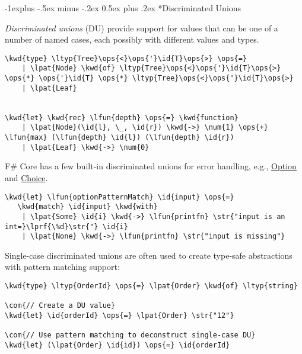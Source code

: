 \documentclass[10pt,landscape]{article}
\makeatletter
\renewcommand{\subsection}{\@startsection{subsection}{2}{0mm}%
                                {-1explus -.5ex minus -.2ex}%
                                {0.5ex plus .2ex}%
                                {\normalfont\normalsize\bfseries}}
\newcommand{\id}[1]{\textcolor[HTML]{000000}{#1}}
\newcommand{\str}[1]{\textcolor[HTML]{A31515}{#1}}
\newcommand{\kwd}[1]{\textcolor[HTML]{0000FF}{#1}}
\newcommand{\com}[1]{\textcolor[HTML]{008000}{#1}}
\newcommand{\ops}[1]{\textcolor[HTML]{000000}{#1}}
\newcommand{\num}[1]{\textcolor[HTML]{000000}{#1}}
\newcommand{\ltyp}[1]{\textcolor[HTML]{2B91AF}{#1}}
\newcommand{\lfun}[1]{\textcolor[HTML]{AA5500}{#1}}
\newcommand{\lpat}[1]{\textcolor[HTML]{800080}{#1}}
\newcommand{\lprf}[1]{\textcolor[HTML]{2B91AF}{#1}}
\makeatother
\begin{document}
\begin{multicols}{3}
\begin{Verbatim}[commandchars=\\\{\}]
\end{Verbatim}

\subsection*{Discriminated Unions}



\emph{Discriminated unions} (DU) provide support for values that can be one of a number of named cases, each possibly with different values and types.
\begin{Verbatim}[commandchars=\\\{\}]
\kwd{type} \ltyp{Tree}\ops{<}\ops{'}\id{T}\ops{>} \ops{=}
    | \lpat{Node} \kwd{of} \ltyp{Tree}\ops{<}\ops{'}\id{T}\ops{>} \ops{*} \ops{'}\id{T} \ops{*} \ltyp{Tree}\ops{<}\ops{'}\id{T}\ops{>}
    | \lpat{Leaf}


\kwd{let} \kwd{rec} \lfun{depth} \ops{=} \kwd{function}
    | \lpat{Node}(\id{l}, \_, \id{r}) \kwd{->} \num{1} \ops{+} \lfun{max} (\lfun{depth} \id{l}) (\lfun{depth} \id{r})
    | \lpat{Leaf} \kwd{->} \num{0}

\end{Verbatim}



F\# Core has a few built-in discriminated unions for error handling, e.g., \href{http://msdn.microsoft.com/en-us/library/dd233245.aspx}{Option} and \href{http://msdn.microsoft.com/en-us/library/ee353439.aspx}{Choice}.
\begin{Verbatim}[commandchars=\\\{\}]
\kwd{let} \lfun{optionPatternMatch} \id{input} \ops{=}
   \kwd{match} \id{input} \kwd{with}
    | \lpat{Some} \id{i} \kwd{->} \lfun{printfn} \str{"input is an int=}\lprf{\%d}\str{"} \id{i}
    | \lpat{None} \kwd{->} \lfun{printfn} \str{"input is missing"}

\end{Verbatim}



Single-case discriminated unions are often used to create type-safe abstractions with pattern matching support:
\begin{Verbatim}[commandchars=\\\{\}]
\kwd{type} \ltyp{OrderId} \ops{=} \lpat{Order} \kwd{of} \ltyp{string}

\com{// Create a DU value}
\kwd{let} \id{orderId} \ops{=} \lpat{Order} \str{"12"}

\com{// Use pattern matching to deconstruct single-case DU}
\kwd{let} (\lpat{Order} \id{id}) \ops{=} \id{orderId}


\end{Verbatim}
\end{multicols}
\end{document}
